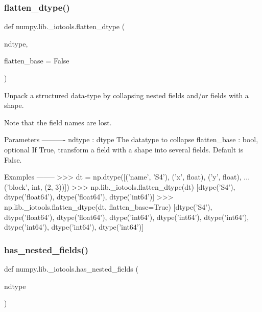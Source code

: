 \subsubsection{\texorpdfstring{flatten\+\_\+dtype()}{flatten\_dtype()}}
{\footnotesize\ttfamily def numpy.\+lib.\+\_\+iotools.\+flatten\+\_\+dtype (\begin{DoxyParamCaption}\item[{}]{ndtype,  }\item[{}]{flatten\+\_\+base = {\ttfamily False} }\end{DoxyParamCaption})}

\begin{DoxyVerb}Unpack a structured data-type by collapsing nested fields and/or fields
with a shape.

Note that the field names are lost.

Parameters
----------
ndtype : dtype
    The datatype to collapse
flatten_base : bool, optional
   If True, transform a field with a shape into several fields. Default is
   False.

Examples
--------
>>> dt = np.dtype([('name', 'S4'), ('x', float), ('y', float),
...                ('block', int, (2, 3))])
>>> np.lib._iotools.flatten_dtype(dt)
[dtype('S4'), dtype('float64'), dtype('float64'), dtype('int64')]
>>> np.lib._iotools.flatten_dtype(dt, flatten_base=True)
[dtype('S4'),
 dtype('float64'),
 dtype('float64'),
 dtype('int64'),
 dtype('int64'),
 dtype('int64'),
 dtype('int64'),
 dtype('int64'),
 dtype('int64')]\end{DoxyVerb}
 \mbox{\label{namespacenumpy_1_1lib_1_1__iotools_a963397b6c785faf85aa430b490365798}} 
\subsubsection{\texorpdfstring{has\+\_\+nested\+\_\+fields()}{has\_nested\_fields()}}
{\footnotesize\ttfamily def numpy.\+lib.\+\_\+iotools.\+has\+\_\+nested\+\_\+fields (\begin{DoxyParamCaption}\item[{}]{ndtype }\end{DoxyParamCaption})}

